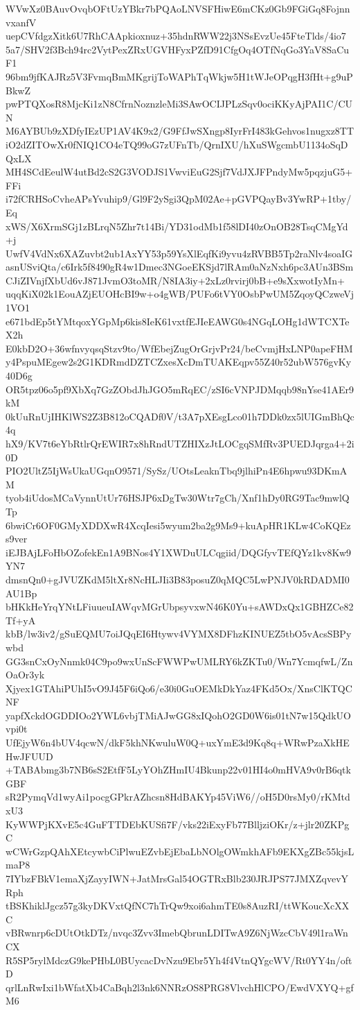 WVwXz0BAuvOvqbOFtUzYBkr7bPQAoLNVSFHiwE6mCKz0Gb9FGiGq8FojnnvxanfV
uepCVfdgzXitk6U7RhCAApkioxnuz+35hdnRWW22j3NSsEvzUe45FteTlds/4io7
5a7/SHV2f3Bch94rc2VytPexZRxUGVHFyxPZfD91CfgOq4OTfNqGo3YaV8SaCuF1
96bm9jfKAJRz5V3FvmqBmMKgrijToWAPhTqWkjw5H1tWJeOPqgH3fHt+g9uPBkwZ
pwPTQXosR8MjcKi1zN8CfrnNoznzleMi3SAwOCIJPLzSqv0ociKKyAjPAI1C/CUN
M6AYBUb9zXDfyIEzUP1AV4K9x2/G9FfJwSXngp8IyrFrI483kGehvos1nugxz8TT
iO2dZITOwXr0fNIQ1CO4eTQ99oG7zUFnTb/QrnIXU/hXuSWgcmbU1134oSqDQxLX
MH4SCdEeulW4utBd2cS2G3VODJS1VwviEuG2Sjf7VdJXJFPndyMw5pqzjuG5+FFi
i72fCRHSoCvheAPsYvuhip9/Gl9F2ySgi3QpM02Ae+pGVPQayBv3YwRP+1tby/Eq
xWS/X6XrmSGj1zBLrqN5Zhr7t14Bi/YD31odMb1f58lDI40zOnOB28TsqCMgYd+j
UwfV4VdNx6XAZuvbt2ub1AxYY53p59YsXlEqfKi9yvu4zRVBB5Tp2raNlv4soaIG
asnUSviQta/c6Irk5f8490gR4w1Dmec3NGoeEKSjd7lRAm0aNzNxh6pc3AUn3BSm
CJiZIVnjfXbUd6vJ871JvmO3toMR/N8IA3iy+2xLz0rvirj0bB+e9sXxwotIyMn+
uqqKiX02k1EouAZjEUOHcBI9w+o4gWB/PUFo6tVY0OsbPwUM5ZqoyQCzweVj1VO1
e671bdEp5tYMtqoxYGpMp6kis8IeK61vxtfEJIeEAWG0s4NGqLOHg1dWTCXTeX2h
E0kbD2O+36wfnvyqsqStzv9to/WfEbejZugOrGrjvPr24/beCvmjHxLNP0apeFHM
y4PspuMEgew2s2G1KDRmdDZTCZxesXcDmTUAKEqpv55Z40r52ubW576gvKy40D6g
OR5tpz06o5pf9XbXq7GzZObdJhJGO5mRqEC/zSI6cVNPJDMqqb98nYse41AEr9kM
0kUuRnUjIHKlWS2Z3B812oCQADf0V/t3A7pXEsgLco01h7DDk0zx5lUIGmBhQc4q
hX9/KV7t6eYbRtlrQrEWIR7x8hRndUTZHIXzJtLOCgqSMfRv3PUEDJqrga4+2i0D
PIO2UltZ5IjWsUkaUGqnO9571/SySz/UOtsLeaknTbq9jlhiPn4E6hpwu93DKmAM
tyob4iUdosMCaVynnUtUr76HSJP6xDgTw30Wtr7gCh/Xnf1hDy0RG9Tac9mwlQTp
6bwiCr6OF0GMyXDDXwR4XcqIesi5wyum2ba2g9Ms9+kuApHR1KLw4CoKQEzs9ver
iEJBAjLFoHbOZofekEn1A9BNos4Y1XWDuULCqgiid/DQGfyvTEfQYz1kv8Kw9YN7
dmsnQn0+gJVUZKdM5ltXr8NcHLJIi3B83posuZ0qMQC5LwPNJV0kRDADMI0AU1Bp
bHKkHeYrqYNtLFiuueuIAWqvMGrUbpsyvxwN46K0Yu+sAWDxQx1GBHZCe82Tf+yA
kbB/lw3iv2/gSuEQMU7oiJQqEI6Htywv4VYMX8DFhzKINUEZ5tbO5vAcsSBPywbd
GG3snCxOyNnmk04C9po9wxUnScFWWPwUMLRY6kZKTu0/Wn7YcmqfwL/ZnOaOr3yk
Xjyex1GTAhiPUhI5vO9J45F6iQo6/e30i0GuOEMkDkYaz4FKd5Ox/XnsClKTQCNF
yapfXckdOGDDIOo2YWL6vbjTMiAJwGG8xIQohO2GD0W6is01tN7w15QdkUOvpi0t
UfEjyW6n4bUV4qcwN/dkF5khNKwuluW0Q+uxYmE3d9Kq8q+WRwPzaXkHEHwJFUUD
+TABAbmg3b7NB6sS2EtfF5LyYOhZHmIU4Bkunp22v01HI4o0mHVA9v0rB6qtkGBF
sR2PymqVd1wyAi1pocgGPkrAZhcsn8HdBAKYp45ViW6//oH5D0rsMy0/rKMtdxU3
KyWWPjKXvE5c4GuFTTDEbKUSfi7F/vks22iExyFb77BlljziOKr/z+jlr20ZKPgC
wCWrGzpQAhXEtcywbCiPlwuEZvbEjEbaLbNOlgOWmkhAFb9EKXgZBc55kjsLmaP8
7IYbzFBkV1emaXjZayyIWN+JatMrsGal54OGTRxBlb230JRJPS77JMXZqvevYRph
tBSKhiklJgcz57g3kyDKVxtQfNC7hTrQw9xoi6ahmTE0s8AuzRI/ttWKoucXcXXC
vBRwnrp6cDUtOtkDTz/nvqc3Zvv3ImebQbrunLDITwA9Z6NjWzcCbV49l1raWnCX
R5SP5rylMdczG9kePHbL0BUycacDvNzu9Ebr5Yh4f4VtnQYgcWV/Rt0YY4n/oftD
qrlLnRwIxi1bWfatXb4CaBqh2l3nk6NNRzOS8PRG8VlvchHlCPO/EwdVXYQ+gfM6
